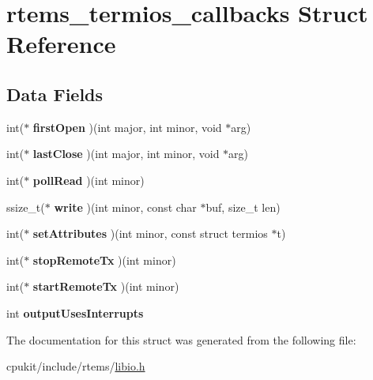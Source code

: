 \hypertarget{structrtems__termios__callbacks}{}\section{rtems\+\_\+termios\+\_\+callbacks Struct Reference}
\label{structrtems__termios__callbacks}
\subsection*{Data Fields}
\begin{DoxyCompactItemize}
\item 
\mbox{\label{structrtems__termios__callbacks_ade942aaadef1125b1794ef07157bf2d8}} 
int($\ast$ {\bfseries first\+Open} )(int major, int minor, void $\ast$arg)
\item 
\mbox{\label{structrtems__termios__callbacks_a138dd1af1fd031fea7c895820403aab2}} 
int($\ast$ {\bfseries last\+Close} )(int major, int minor, void $\ast$arg)
\item 
\mbox{\label{structrtems__termios__callbacks_ae08a1ee4e44aa4d57222d5289fc6786e}} 
int($\ast$ {\bfseries poll\+Read} )(int minor)
\item 
\mbox{\label{structrtems__termios__callbacks_a113aeed6788e81d26621dc53c4f67991}} 
ssize\+\_\+t($\ast$ {\bfseries write} )(int minor, const char $\ast$buf, size\+\_\+t len)
\item 
\mbox{\label{structrtems__termios__callbacks_a6b0dc4e545a198d469ef3e993cbc9e3b}} 
int($\ast$ {\bfseries set\+Attributes} )(int minor, const struct termios $\ast$t)
\item 
\mbox{\label{structrtems__termios__callbacks_ad8846ffde83d929c9d3f7160ad69aabb}} 
int($\ast$ {\bfseries stop\+Remote\+Tx} )(int minor)
\item 
\mbox{\label{structrtems__termios__callbacks_ae1c2ad0c707615a018284dc96c1ac39f}} 
int($\ast$ {\bfseries start\+Remote\+Tx} )(int minor)
\item 
\mbox{\label{structrtems__termios__callbacks_af93d37509342977794bbef2766b623c7}} 
int {\bfseries output\+Uses\+Interrupts}
\end{DoxyCompactItemize}


The documentation for this struct was generated from the following file\+:\begin{DoxyCompactItemize}
\item 
cpukit/include/rtems/\mbox{\hyperlink{libio_8h}{libio.\+h}}\end{DoxyCompactItemize}

